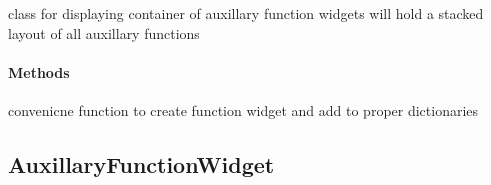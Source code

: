 \documentclass[letterpaper,10pt,english]{sphinxmanual}
\begin{document}
\begin{fulllineitems}
\label{AuxillaryFunctionContainerWidget:Auxfuncwidget.AuxillaryFunctionContainerWidget}
class for displaying container of auxillary function widgets
will hold a stacked layout of all auxillary functions
\paragraph{Methods}

\begin{fulllineitems}
\label{AuxillaryFunctionContainerWidget:Auxfuncwidget.AuxillaryFunctionContainerWidget.add_element}
convenicne function to create function widget and add to proper
dictionaries

\end{fulllineitems}


\begin{fulllineitems}
\label{AuxillaryFunctionContainerWidget:Auxfuncwidget.AuxillaryFunctionContainerWidget.re_import}
\end{fulllineitems}


\end{fulllineitems}



\subsection{AuxillaryFunctionWidget}
\label{AuxillaryFunctionWidget::doc}\label{AuxillaryFunctionWidget:auxillaryfunctionwidget}
\end{document}
